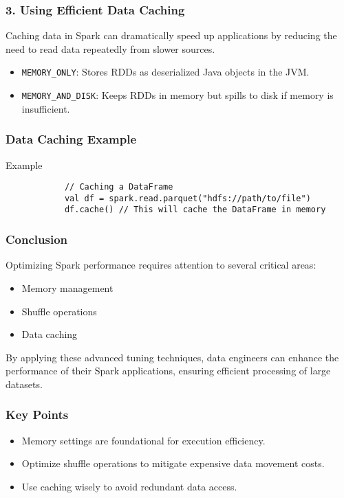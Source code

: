 \documentclass[aspectratio=169]{beamer}
\begin{document}
\begin{frame}
    \frametitle{3. Using Efficient Data Caching}
    Caching data in Spark can dramatically speed up applications by reducing the need to read data repeatedly from slower sources.
    
    \begin{itemize}
        \item \texttt{MEMORY\_ONLY}: Stores RDDs as deserialized Java objects in the JVM.
        \item \texttt{MEMORY\_AND\_DISK}: Keeps RDDs in memory but spills to disk if memory is insufficient.
    \end{itemize}
\end{frame}

\begin{frame}[fragile]
    \frametitle{Data Caching Example}
    \begin{block}{Example}
        \begin{lstlisting}
            // Caching a DataFrame
            val df = spark.read.parquet("hdfs://path/to/file")
            df.cache() // This will cache the DataFrame in memory
        \end{lstlisting}
    \end{block}
\end{frame}

\begin{frame}
    \frametitle{Conclusion}
    Optimizing Spark performance requires attention to several critical areas:
    \begin{itemize}
        \item Memory management
        \item Shuffle operations
        \item Data caching
    \end{itemize}
    By applying these advanced tuning techniques, data engineers can enhance the performance of their Spark applications, ensuring efficient processing of large datasets.
\end{frame}

\begin{frame}
    \frametitle{Key Points}
    \begin{itemize}
        \item Memory settings are foundational for execution efficiency.
        \item Optimize shuffle operations to mitigate expensive data movement costs.
        \item Use caching wisely to avoid redundant data access.
    \end{itemize}
\end{frame}
\end{document}

